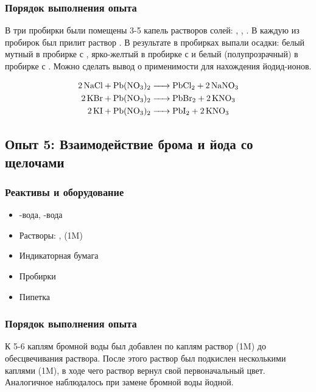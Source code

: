 \documentclass[a4paper, 12pt]{article}
\begin{document}
\subsubsection{Порядок выполнения опыта}

В три пробирки были помещены 3-5 капель растворов солей: , , . В каждую из пробирок был прилит раствор . В результате в пробирках выпали осадки: белый мутный в пробирке с , ярко-желтый в пробирке с  и белый (полупрозрачный) в пробирке с . Можно сделать вывод о применимости  для нахождения йодид-ионов. %

\begin{align}
	\ce{2NaCl + Pb(NO3)2 &-> PbCl2 + 2 NaNO3}\\
	\ce{2KBr + Pb(NO3)2 &-> PbBr2 + 2 KNO3}\\
	\ce{2KI + Pb(NO3)2 &-> PbI2 + 2 KNO3}\\
\end{align}


\subsection{Опыт 5: Взаимодействие брома и йода со щелочами}

\subsubsection{Реактивы и оборудование}

\begin{itemize}
	\item {}-вода, -вода
	
	\item Растворы: ,  (1M)
	
	\item Индикаторная бумага
	
	\item Пробирки
	
	\item Пипетка
\end{itemize}

\subsubsection{Порядок выполнения опыта}

К 5-6 каплям бромной воды был добавлен по каплям раствор  (1M) до обесцвечивания раствора. После этого раствор был подкислен несколькими каплями  (1M), в ходе чего раствор вернул свой первоначальный цвет. Аналогичное наблюдалось при замене бромной воды йодной.
\end{document}
